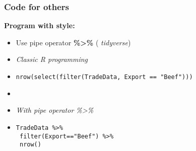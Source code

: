 \documentclass[xcolor=x11names,compress]{beamer}
\renewcommand{\(}{\begin{columns}}
\renewcommand{\)}{\end{columns}}
\newcommand{\<}[1]{\begin{column}{#1}}
\renewcommand{\>}{\end{column}}
\begin{document}
\begin{frame}[<+->]
\frametitle{Code for others }
\textcolor{siap}{\textbf{Program with style:}} \\
  \begin{itemize}
     \item[] Use pipe operator \textbf{\%>\% } ( \emph{tidyverse})
     \item[] \emph{Classic R programming}
     \item[] { \scriptsize   \texttt{nrow(select(filter(TradeData, Export == "Beef"))) }} \\
     \item[]
     \item[] \emph{With pipe operator \%>\% }
     \item[]{ \scriptsize  \texttt{TradeData \%>\% } \\
                            \texttt{  filter(Export=="Beef") \%>\% } \\
                            \texttt{ nrow()} }

 \end{itemize}
\end{frame}
\end{document}
